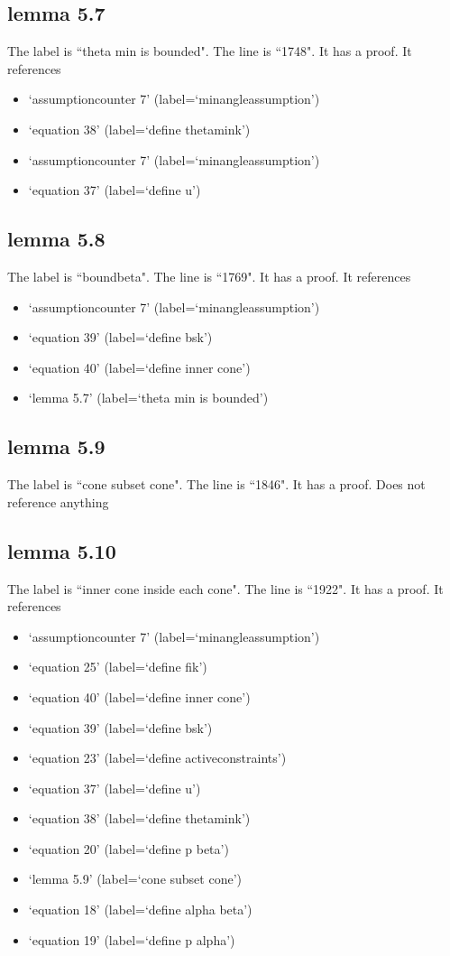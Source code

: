 \documentclass{article}
\begin{document}
\subsection{lemma 5.7}
The label is ``theta min is bounded".
The line is ``1748".
It has a proof.
It references \begin{itemize}
\item `assumptioncounter 7' (label=`minangleassumption')
\item `equation 38' (label=`define thetamink')
\item `assumptioncounter 7' (label=`minangleassumption')
\item `equation 37' (label=`define u')
\end{itemize}
\subsection{lemma 5.8}
The label is ``boundbeta".
The line is ``1769".
It has a proof.
It references \begin{itemize}
\item `assumptioncounter 7' (label=`minangleassumption')
\item `equation 39' (label=`define bsk')
\item `equation 40' (label=`define inner cone')
\item `lemma 5.7' (label=`theta min is bounded')
\end{itemize}
\subsection{lemma 5.9}
The label is ``cone subset cone".
The line is ``1846".
It has a proof.
Does not reference anything
\subsection{lemma 5.10}
The label is ``inner cone inside each cone".
The line is ``1922".
It has a proof.
It references \begin{itemize}
\item `assumptioncounter 7' (label=`minangleassumption')
\item `equation 25' (label=`define fik')
\item `equation 40' (label=`define inner cone')
\item `equation 39' (label=`define bsk')
\item `equation 23' (label=`define activeconstraints')
\item `equation 37' (label=`define u')
\item `equation 38' (label=`define thetamink')
\item `equation 20' (label=`define p beta')
\item `lemma 5.9' (label=`cone subset cone')
\item `equation 18' (label=`define alpha beta')
\item `equation 19' (label=`define p alpha')
\end{itemize}
\end{document}
